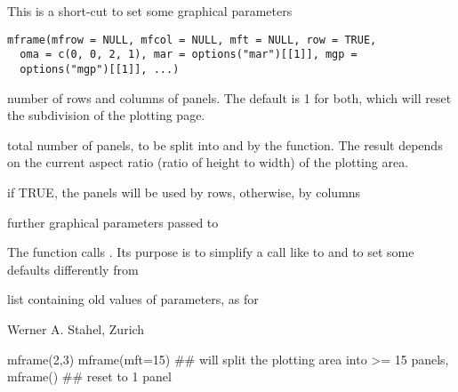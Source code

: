 \documentclass{article}
\begin{document}
\begin{Description}\relax
This is a short-cut to set some graphical parameters
\end{Description}
\begin{Usage}
\begin{verbatim}
mframe(mfrow = NULL, mfcol = NULL, mft = NULL, row = TRUE,
  oma = c(0, 0, 2, 1), mar = options("mar")[[1]], mgp =
  options("mgp")[[1]], ...)
\end{verbatim}
\end{Usage}
\begin{Arguments}
\begin{ldescription}
\item[\code{mfrow, mfcol}] number of rows and columns of panels. The default
is 1 for both, which will reset the subdivision of the plotting page.
\item[\code{mft}] total number of panels, to be split into 
and  by the function. The result depends on the current
aspect ratio (ratio of height to width) of the plotting area.
\item[\code{row}] if TRUE, the panels will be used by rows, otherwise, by columns
\item[\code{oma, mar, mgp, ...}] further graphical parameters passed to
\end{ldescription}
\end{Arguments}
\begin{Details}\relax
The function calls . Its purpose is to simplify a call like
 to  and to set some
defaults differently from 
\end{Details}
\begin{Value}
list containing old values of parameters, as for 
\end{Value}
\begin{Author}\relax
Werner A. Stahel, Zurich
\end{Author}
\begin{SeeAlso}\relax
{}
\end{SeeAlso}
\begin{Examples}
\begin{ExampleCode}
mframe(2,3)  
mframe(mft=15)  ## will split the plotting area into >= 15 panels, 
mframe()  ## reset to 1 panel
\end{ExampleCode}
\end{Examples}
\end{document}
